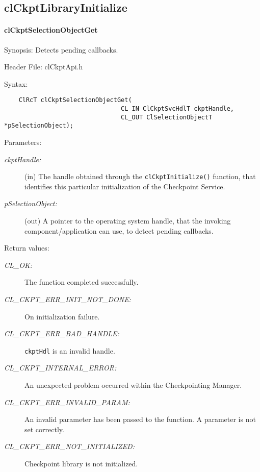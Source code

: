 \begin{flushleft}
\newpage


\subsection{clCkptLibraryInitialize }
\hypertarget{pageckpt122}{}\paragraph{cl\-Ckpt\-Selection\-Object\-Get}\label{pageckpt122}
\begin{Desc}
\item[Synopsis:]Detects pending callbacks.\end{Desc}
\begin{Desc}
\item[Header File:]clCkptApi.h\end{Desc}
\begin{Desc}
\item[Syntax:]

\footnotesize\begin{verbatim}    ClRcT clCkptSelectionObjectGet(
                       			CL_IN ClCkptSvcHdlT ckptHandle,
                       			CL_OUT ClSelectionObjectT *pSelectionObject);
\end{verbatim}
\normalsize
\end{Desc}
\begin{Desc}
\item[Parameters:]
\begin{description}
\item[{\em ckpt\-Handle:}](in) The handle obtained through the {\tt{clCkptInitialize()}} function, that identifies this 
particular initialization of the Checkpoint Service.
\item[{\em p\-Selection\-Object:}](out) A pointer to the operating system handle, that the invoking component/application can use, to detect pending
callbacks.\end{description}
\end{Desc}
\begin{Desc}
\item[Return values:]
\begin{description}
\item[{\em CL\_\-OK:}]The function completed successfully. \item[{\em CL\_\-CKPT\_\-ERR\_\-INIT\_\-NOT\_\-DONE:}]On initialization failure.
\item[{\em CL\_\-CKPT\_\-ERR\_\-BAD\_\-HANDLE:}]{\tt{ckptHdl}} is an invalid handle.
\item[{\em CL\_\-CKPT\_\-INTERNAL\_\-ERROR:}]An unexpected problem occurred within the Checkpointing Manager. 
\item[{\em CL\_\-CKPT\_\-ERR\_\-INVALID\_\-PARAM:}]An invalid parameter has been passed to the function. A parameter is not set correctly.
\item[{\em CL\_\-CKPT\_\-ERR\_\-NOT\_\-INITIALIZED:}]Checkpoint library is not initialized.


\end{description}
\end{Desc}
\end{flushleft}
